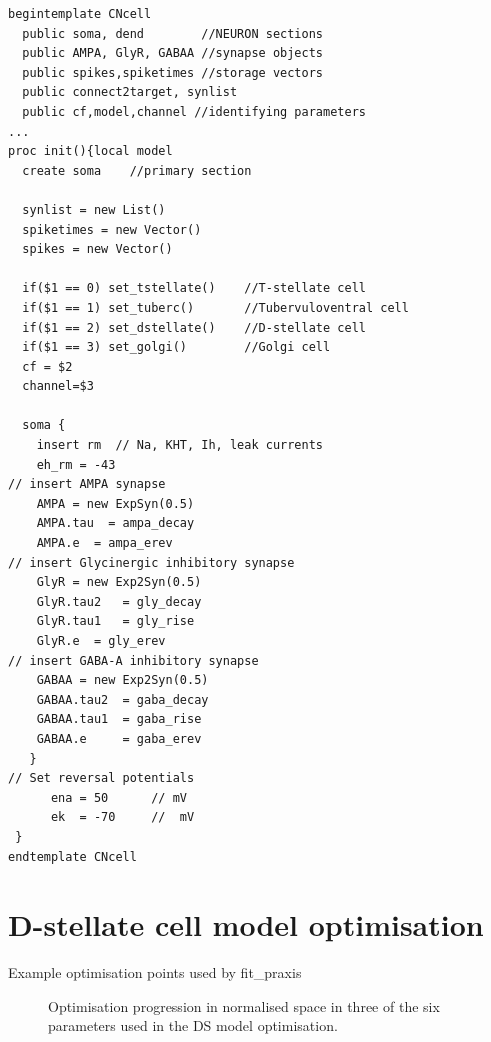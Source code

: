 \begin{lstlisting}[label=lst:CellTemplate,caption=Rothman and Manis cochlear
  nucleus cell template (in CNcell.tem)]
begintemplate CNcell
  public soma, dend        //NEURON sections
  public AMPA, GlyR, GABAA //synapse objects 
  public spikes,spiketimes //storage vectors
  public connect2target, synlist 
  public cf,model,channel //identifying parameters
...
proc init(){local model
  create soma    //primary section

  synlist = new List()
  spiketimes = new Vector()
  spikes = new Vector()
    
  if($1 == 0) set_tstellate()    //T-stellate cell
  if($1 == 1) set_tuberc()       //Tubervuloventral cell
  if($1 == 2) set_dstellate()    //D-stellate cell
  if($1 == 3) set_golgi()        //Golgi cell
  cf = $2
  channel=$3

  soma {
    insert rm  // Na, KHT, Ih, leak currents 
    eh_rm = -43 
// insert AMPA synapse 
    AMPA = new ExpSyn(0.5)
    AMPA.tau  = ampa_decay
    AMPA.e 	= ampa_erev
// insert Glycinergic inhibitory synapse 
    GlyR = new Exp2Syn(0.5)
    GlyR.tau2	= gly_decay
    GlyR.tau1	= gly_rise
    GlyR.e 	= gly_erev
// insert GABA-A inhibitory synapse 
    GABAA = new Exp2Syn(0.5)
    GABAA.tau2 	= gaba_decay
    GABAA.tau1 	= gaba_rise
    GABAA.e 	= gaba_erev
   }
// Set reversal potentials 
      ena = 50		// mV
      ek  = -70		//  mV
 }
endtemplate CNcell 

\end{lstlisting}

\section{D-stellate cell model optimisation}

Example optimisation points used by \textsf{fit\_praxis} 
\begin{figure}[htb]
\centering
{}
 \caption{Optimisation progression in normalised space in three of the six parameters used in the DS model optimisation.} \label{fig:praxis}
 \end{figure}


